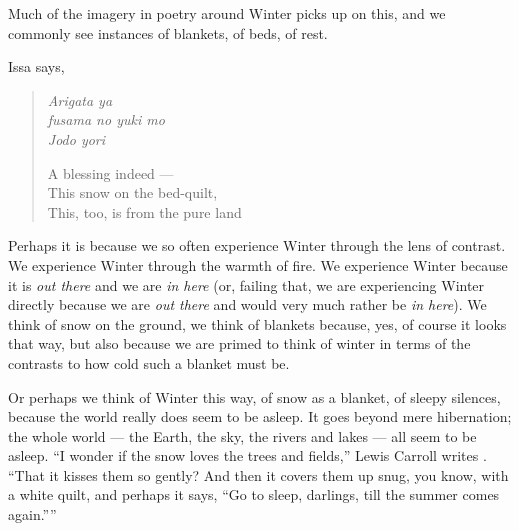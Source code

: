 \documentclass[12pt]{memoir}
\begin{document}
Much of the imagery in poetry around Winter picks up on this, and we commonly see instances of blankets, of beds, of rest.

Issa says,

\begin{verse}
\begin{multicols}{2}
\emph{Arigata ya} \\
\emph{fusama no yuki mo} \\
\emph{Jodo yori}

\columnbreak

A blessing indeed --- \\
This snow on the bed-quilt, \\
This, too, is from the pure land
\end{multicols}
\vspace{-1em}
\parencite[46]{issa}
\end{verse}

Perhaps it is because we so often experience Winter through the lens of contrast. We experience Winter through the warmth of fire. We experience Winter because it is \emph{out there} and we are \emph{in here} (or, failing that, we are experiencing Winter directly because we are \emph{out there} and would very much rather be \emph{in here}). We think of snow on the ground, we think of blankets because, yes, of course it looks that way, but also because we are primed to think of winter in terms of the contrasts to how cold such a blanket must be.

Or perhaps we think of Winter this way, of snow as a blanket, of sleepy silences, because the world really does seem to be asleep. It goes beyond mere hibernation; the whole world --- the Earth, the sky, the rivers and lakes --- all seem to be asleep. ``I wonder if the snow loves the trees and fields,'' Lewis Carroll writes \parencite{carroll}. ``That it kisses them so gently? And then it covers them up snug, you know, with a white quilt, and perhaps it says, ``Go to sleep, darlings, till the summer comes again.''''
\end{document}
